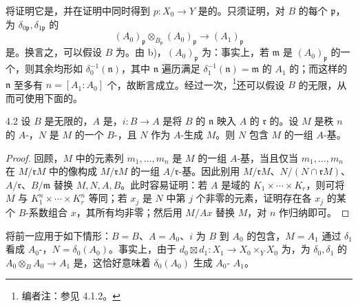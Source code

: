 将证明它是，并在证明中同时得到 $p:X_0\to Y$ 是的。只须证明，对 $B$ 的每个 $\mathfrak p$，为 $\delta_{0\mathfrak p},\delta_{1\mathfrak p}$ 的
\[(A_0)_{\mathfrak p}\otimes_{B_{\mathfrak p}}(A_0)_{\mathfrak p}\longrightarrow(A_1)_{\mathfrak p}\]
是。换言之，可以假设 $B$ 为。由 b)，$(A_0)_{\mathfrak p}$ 为：事实上，若 $\mathfrak m$ 是 $(A_0)_{\mathfrak p}$ 的一个，则其余均形如 $\delta_0^{-1}(\mathfrak n)$，其中 $\mathfrak n$ 遍历满足 $\delta_1^{-1}(\mathfrak n)=\mathfrak m$ 的 $A_1$ 的；而这样的 $\mathfrak n$ 至多有 $n=[A_1:A_0]$ 个，故断言成立。经过一次，\footnote{编者注：参见 4.1.2。}还可以假设 $B$ 的无限，从而可使用下面的。
\begin{SGAresult}{}{4.2}
设 $B$ 是无限的，$A$ 是，$i:B\to A$ 是将 $B$ 的 $\mathfrak n$ 映入 $A$ 的 $\mathfrak r$ 的。设 $M$ 是秩 $n$ 的 $A$-，$N$ 是 $M$ 的一个 $B$-，且 $N$ 作为 $A$-生成 $M$。则 $N$ 包含 $M$ 的一组 $A$-基。
\end{SGAresult}
\begin{proof}
回顾，$M$ 中的元素列 $m_1,\ldots,m_n$ 是 $M$ 的一组 $A$-基，当且仅当 $m_1,\ldots,m_n$ 在 $M/\mathfrak rM$ 中的像构成 $M/\mathfrak rM$ 的一组 $A/\mathfrak r$-基。因此别用 $M/\mathfrak rM$、$N/(N\cap\mathfrak rM)$、$A/\mathfrak r$、$B/\mathfrak m$ 替换 $M,N,A,B$。此时容易证明：若 $A$ 是域的 $K_1\times\cdots\times K_r$，则可将 $M$ 与 $K_1^n\times\cdots\times K_r^n$ 等同；若 $x_j$ 是 $N$ 中第 $j$ 个非零的元素，证明存在各 $x_j$ 的某个 $B$-系数组合 $x$，其所有均非零；然后用 $M/Ax$ 替换 $M$，对 $n$ 作归纳即可。
\end{proof}
将前一应用于如下情形：$B=B$、$A=A_0$、$i$ 为 $B$ 到 $A_0$ 的包含，$M=A_1$ 通过 $\delta_1$ 看成 $A_0$-，$N=\delta_0(A_0)$。事实上，由于 $d_0\boxtimes d_1:X_1\to X_0\times_YX_0$ 为，为 $\delta_0,\delta_1$ 的 $A_0\otimes_BA_0\to A_1$ 是，这恰好意味着 $\delta_0(A_0)$ 生成 $A_0$- $A_1$。

